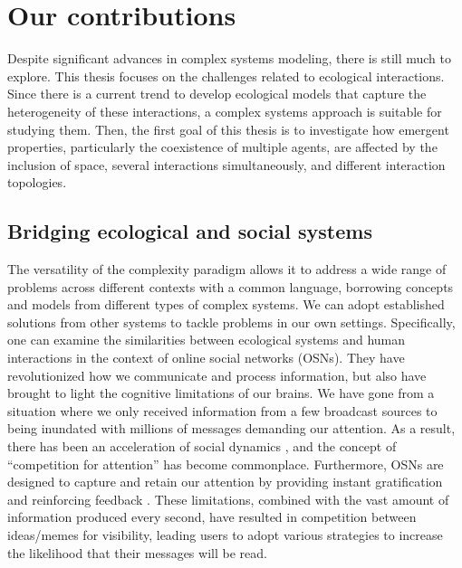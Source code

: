 \section{Our contributions}
Despite significant advances in complex systems modeling, there is still much to explore. This thesis focuses on the challenges related to ecological interactions. Since there is a current trend to develop ecological models that capture the heterogeneity of these interactions, a complex systems approach is suitable for studying them. Then, the first goal of this thesis is to investigate how emergent properties, particularly the coexistence of multiple agents, are affected by the inclusion of space, several interactions simultaneously, and different interaction topologies. \\


\subsection{Bridging ecological and social systems}\label{chp:intro:bridge}
 The versatility of the complexity paradigm allows it to address a wide range of problems across different contexts with a common language, borrowing concepts and models from different types of complex systems. We can adopt established solutions from other systems to tackle problems in our own settings. Specifically,  one can examine the similarities between ecological systems and human interactions in the context of online social networks (OSNs). They have revolutionized how we communicate and process information, but also have brought to light the cognitive limitations of our brains. We have gone from a situation where we only received information from a few broadcast sources to being inundated with millions of messages demanding our attention. As a result, there has been an acceleration of social dynamics \cite{lorenz2019accelerating}, and the concept of ``competition for attention'' has become commonplace. Furthermore, OSNs are designed to capture and retain our attention by providing instant gratification \cite{fareri2014social,malik2016gratification} and reinforcing feedback \cite{sherman2018brain}. These limitations, combined with the vast amount of information produced every second, have resulted in competition between ideas/memes for visibility, leading users to adopt various strategies to increase the likelihood that their messages will be read. \\

